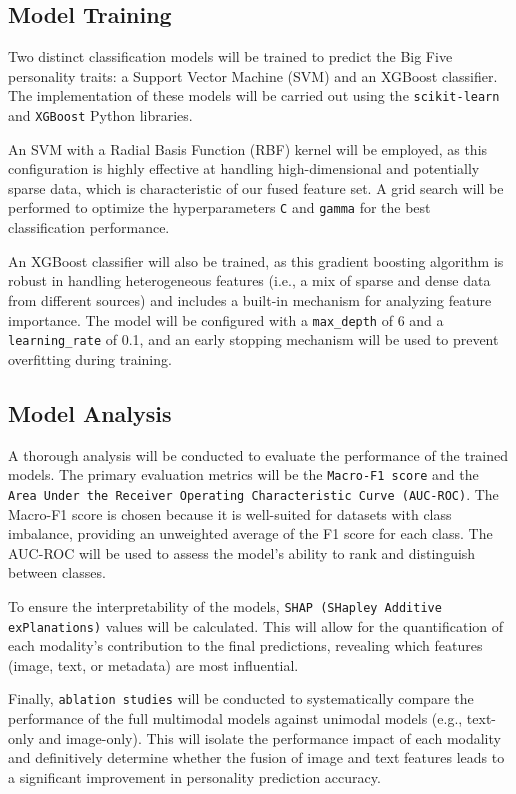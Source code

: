 \subsection{Model Training}
\label{subsec:models}

Two distinct classification models will be trained to predict the Big Five personality traits: a Support Vector Machine (SVM) and an XGBoost classifier. The implementation of these models will be carried out using the \texttt{scikit-learn} \citet{pedregosa2011} and \texttt{XGBoost} \citet{chen2016}  Python libraries.

An SVM with a Radial Basis Function (RBF) kernel will be employed, as this configuration is highly effective at handling high-dimensional and potentially sparse data, which is characteristic of our fused feature set. A grid search will be performed to optimize the hyperparameters \texttt{C} and \texttt{gamma} for the best classification performance.

An XGBoost classifier will also be trained, as this gradient boosting algorithm is robust in handling heterogeneous features (i.e., a mix of sparse and dense data from different sources) and includes a built-in mechanism for analyzing feature importance. The model will be configured with a  \texttt{max\_depth} of 6 and a \texttt{learning\_rate} of 0.1, and an early stopping mechanism will be used to prevent overfitting during training.

\subsection{Model Analysis}
\label{subsec:analysis}
A thorough analysis will be conducted to evaluate the performance of the trained models. The primary evaluation metrics will be the \texttt{Macro-F1 score} and the \texttt{Area Under the Receiver Operating Characteristic Curve (AUC-ROC)}. The Macro-F1 score is chosen because it is well-suited for datasets with class imbalance, providing an unweighted average of the F1 score for each class. The AUC-ROC will be used to assess the model's ability to rank and distinguish between classes.

To ensure the interpretability of the models, \texttt{SHAP (SHapley Additive exPlanations)} values will be calculated. This will allow for the quantification of each modality's contribution to the final predictions, revealing which features (image, text, or metadata) are most influential.

Finally, \texttt{ablation studies} will be conducted to systematically compare the performance of the full multimodal models against unimodal models (e.g., text-only and image-only). This will isolate the performance impact of each modality and definitively determine whether the fusion of image and text features leads to a significant improvement in personality prediction accuracy.

